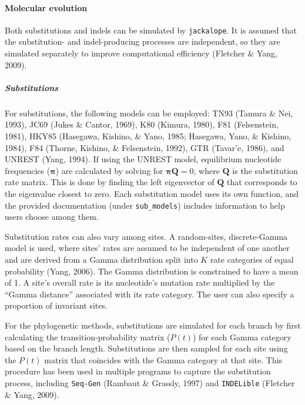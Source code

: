 \documentclass[12pt,]{article}
\let\oldparagraph\paragraph
\renewcommand{\paragraph}[1]{\oldparagraph{#1}\mbox{}}
\let\oldsubparagraph\subparagraph
\renewcommand{\subparagraph}[1]{\oldsubparagraph{#1}\mbox{}}
\begin{document}
\hypertarget{molecular-evolution}{%
\paragraph{Molecular evolution}\label{molecular-evolution}}

Both substitutions and indels can be simulated by \texttt{jackalope}.
It is assumed that the substitution- and indel-producing processes are independent,
so they are simulated separately to improve computational efficiency (Fletcher \& Yang, 2009).

\hypertarget{substitutions}{%
\subparagraph{Substitutions}\label{substitutions}}

For substitutions, the following models can be employed:
TN93 (Tamura \& Nei, 1993),
JC69 (Jukes \& Cantor, 1969),
K80 (Kimura, 1980),
F81 (Felsenstein, 1981),
HKY85 (Hasegawa, Kishino, \& Yano, 1985; Hasegawa, Yano, \& Kishino, 1984),
F84 (Thorne, Kishino, \& Felsenstein, 1992),
GTR (Tavar\a'e, 1986),
and UNREST (Yang, 1994).
If using the UNREST model, equilibrium nucleotide frequencies (\(\mathbf{\pi}\)) are
calculated by solving for \(\mathbf{\pi} \mathbf{Q} = 0\), where \(\mathbf{Q}\) is the
substitution rate matrix.
This is done by finding the left eigenvector of \(\mathbf{Q}\) that
corresponds to the eigenvalue closest to zero.
Each substitution model uses its own function, and the provided documentation
(under \texttt{sub\_models}) includes information to help users choose among them.

Substitution rates can also vary among sites.
A random-sites, discrete-Gamma model is used, where sites' rates are assumed to
be independent of one another and are derived from a Gamma distribution split into
\(K\) rate categories of equal probability (Yang, 2006).
The Gamma distribution is constrained to have a mean of 1.
A site's overall rate is its nucleotide's mutation rate multiplied by the
``Gamma distance'' associated with its rate category.
The user can also specify a proportion of invariant sites.

For the phylogenetic methods, substitutions are simulated for each branch by first
calculating the transition-probability matrix (\(P(t)\)) for each Gamma category based on
the branch length.
Substitutions are then sampled for each site using the \(P(t)\) matrix that coincides with
the Gamma category at that site.
This procedure has been used in multiple programs to capture the substitution process,
including \texttt{Seq-Gen} (Rambaut \& Grassly, 1997) and \texttt{INDELible} (Fletcher \& Yang, 2009).
\end{document}
